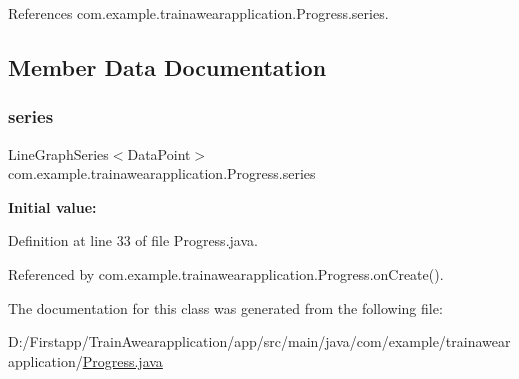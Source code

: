 References com.\+example.\+trainawearapplication.\+Progress.\+series.



\subsection{Member Data Documentation}
\mbox{\label{classcom_1_1example_1_1trainawearapplication_1_1_progress_aabc138eefea8d53b722c9b0a19262c90}} 
\subsubsection{\texorpdfstring{series}{series}}
{\footnotesize\ttfamily Line\+Graph\+Series$<$Data\+Point$>$ com.\+example.\+trainawearapplication.\+Progress.\+series\hspace{0.3cm}{\ttfamily [package]}}

{\bfseries Initial value\+:}
\begin{DoxyCode}{0}
\DoxyCodeLine{    \})}

\end{DoxyCode}


Definition at line 33 of file Progress.\+java.



Referenced by com.\+example.\+trainawearapplication.\+Progress.\+on\+Create().



The documentation for this class was generated from the following file\+:\begin{DoxyCompactItemize}
\item 
D\+:/\+Firstapp/\+Train\+Awearapplication/app/src/main/java/com/example/trainawearapplication/\mbox{\hyperlink{_progress_8java}{Progress.\+java}}\end{DoxyCompactItemize}
